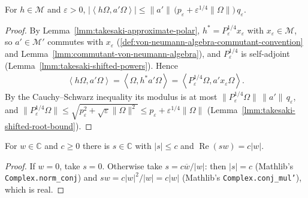 \begin{lemma}
    \label{lmm:takesaki-numerator-bound}
    \leanok
    For $h \in \mathcal{M}$ and $\varepsilon > 0$, $|\left< h\Omega, a'\Omega \right>| \le \|a'\|\, \big( p_\varepsilon + \varepsilon^{1/4}\|\Omega\| \big)\, q_\varepsilon$.
\end{lemma}
\begin{proof}
    \leanok
    By Lemma~\ref{lmm:takesaki-approximate-polar}, $h^* = P_\varepsilon^{1/4}x_\varepsilon$ with $x_\varepsilon \in \mathcal{M}$, so $a' \in \mathcal{M}'$ commutes with $x_\varepsilon$ (\ref{def:von-neumann-algebra-commutant-convention} and Lemma~\ref{lmm:commutant-von-neumann-algebra}), and $P_\varepsilon^{1/4}$ is self-adjoint (Lemma~\ref{lmm:takesaki-shifted-powers}). Hence
    \begin{align}
        \left< h\Omega, a'\Omega \right> = \left< \Omega, h^*a'\Omega \right> = \left< P_\varepsilon^{1/4}\Omega, a'x_\varepsilon\Omega \right>.
    \end{align}
    By the Cauchy--Schwarz inequality its modulus is at most $\|P_\varepsilon^{1/4}\Omega\|\,\|a'\|\,q_\varepsilon$, and $\|P_\varepsilon^{1/4}\Omega\| \le \sqrt{p_\varepsilon^2 + \sqrt{\varepsilon}\|\Omega\|^2} \le p_\varepsilon + \varepsilon^{1/4}\|\Omega\|$ (Lemma~\ref{lmm:takesaki-shifted-root-bound}).
\end{proof}

\begin{lemma}
    \label{lmm:complex-rotation-choice}
    \leanok
    For $w \in \mathbb{C}$ and $c \ge 0$ there is $s \in \mathbb{C}$ with $|s| \le c$ and $\operatorname{Re}(sw) = c|w|$.
\end{lemma}
\begin{proof}
    \leanok
    If $w = 0$, take $s = 0$. Otherwise take $s = c\overline{w}/|w|$: then $|s| = c$ (Mathlib's \texttt{Complex.norm\_conj}) and $sw = c|w|^2/|w| = c|w|$ (Mathlib's \texttt{Complex.conj\_mul'}), which is real.
\end{proof}

